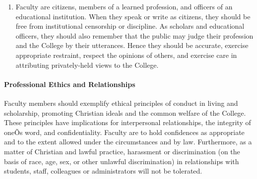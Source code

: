 \documentclass[letterpaper, 11pt]{article}
\begin{document}
\begin{enumerate}[label=\alph*)]
{\begin{enumerate}[label=\arabic*)]
							\item{Faculty are citizens, members of a learned profession, and officers of an educational institution.  When they speak or write as citizens, they should be free from institutional censorship or discipline.  As scholars and educational officers, they should also remember that the public may judge their profession and the College by their utterances.  Hence they should be accurate, exercise appropriate restraint, respect the opinions of others, and exercise care in attributing privately-held views to the College.}
						\end{enumerate}
					}
				\end{enumerate}
			\paragraph{Professional Ethics and Relationships}
				Faculty members should exemplify ethical principles of conduct in living and scholarship, promoting Christian ideals and the common welfare of the College.  These principles have implications for interpersonal relationships, the integrity of oneÕs word, and confidentiality.  Faculty are to hold confidences as appropriate and to the extent allowed under the circumstances and by law.  Furthermore, as a matter of Christian and lawful practice, harassment or discrimination (on the basis of race, age, sex, or other unlawful discrimination) in relationships with students, staff, colleagues or administrators will not be tolerated.
\end{document}
